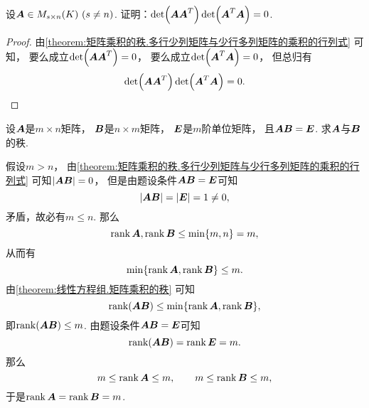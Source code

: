 \begin{example}
设\(\boldsymbol{A} \in M_{s \times n}(K)\ (s \neq n)\).
证明：\(\det(\boldsymbol{A} \boldsymbol{A}^T) \det(\boldsymbol{A}^T \boldsymbol{A}) = 0\).
\begin{proof}
由\cref{theorem:矩阵乘积的秩.多行少列矩阵与少行多列矩阵的乘积的行列式} 可知，
要么成立\(\det(\boldsymbol{A} \boldsymbol{A}^T) = 0\)，
要么成立\(\det(\boldsymbol{A}^T \boldsymbol{A}) = 0\)，
但总归有\begin{equation*}
	\det(\boldsymbol{A} \boldsymbol{A}^T) \det(\boldsymbol{A}^T \boldsymbol{A}) = 0.
	\qedhere
\end{equation*}
\end{proof}
\end{example}

\begin{example}
设\(\boldsymbol{A}\)是\(m \times n\)矩阵，
\(\boldsymbol{B}\)是\(n \times m\)矩阵，
\(\boldsymbol{E}\)是\(m\)阶单位矩阵，
且\(\boldsymbol{A} \boldsymbol{B} = \boldsymbol{E}\).
求\(\boldsymbol{A}\)与\(\boldsymbol{B}\)的秩.
\begin{solution}
假设\(m > n\)，
由\cref{theorem:矩阵乘积的秩.多行少列矩阵与少行多列矩阵的乘积的行列式}
可知\(\abs{\boldsymbol{A} \boldsymbol{B}} = 0\)，
但是由题设条件\(\boldsymbol{A} \boldsymbol{B} = \boldsymbol{E}\)可知\begin{equation*}
	\abs{\boldsymbol{A} \boldsymbol{B}} = \abs{\boldsymbol{E}} = 1 \neq 0,
\end{equation*}
矛盾，故必有\(m \leq n\).
那么\begin{equation*}
	\rank\boldsymbol{A},\rank\boldsymbol{B} \leq \min\{m,n\} = m,
\end{equation*}
从而有\begin{equation*}
	\min\{\rank\boldsymbol{A},\rank\boldsymbol{B}\} \leq m.
\end{equation*}
由\cref{theorem:线性方程组.矩阵乘积的秩} 可知\begin{equation*}
	\rank(\boldsymbol{A} \boldsymbol{B}) \leq \min\{\rank\boldsymbol{A},\rank\boldsymbol{B}\},
\end{equation*}
即\(\rank(\boldsymbol{A} \boldsymbol{B}) \leq m\).
由题设条件\(\boldsymbol{A} \boldsymbol{B} = \boldsymbol{E}\)可知\begin{equation*}
	\rank(\boldsymbol{A} \boldsymbol{B}) = \rank\boldsymbol{E} = m.
\end{equation*}
那么\begin{equation*}
	m \leq \rank\boldsymbol{A} \leq m,
	\qquad
	m \leq \rank\boldsymbol{B} \leq m,
\end{equation*}
于是\(\rank\boldsymbol{A} = \rank\boldsymbol{B} = m\).
\end{solution}
\end{example}

